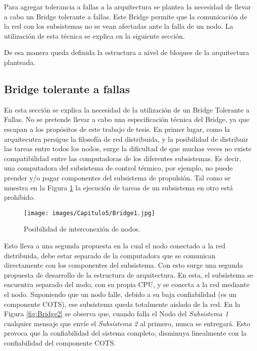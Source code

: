 Para agregar tolerancia a fallas a la arquitectura se plantea la necesidad de 
llevar a cabo un Bridge tolerante a fallas. Este Bridge permite que la comunicación de la red
con los subsistemas no se vean afectadas ante la falla de un nodo. La utilización
de esta técnica se explica en la siguiente sección.

De esa manera queda definida la estructura a nivel de bloques de la arquitectura
planteada. 

\subsection{Bridge tolerante a fallas}\label{subsec:bridge}
En esta sección se explica la necesidad de la utilización de un Bridge 
Tolerante a Fallas. No se pretende llevar a cabo una especificación técnica
del Bridge, ya que escapan a los propósitos de este trabajo de tesis. 
En primer lugar, como la arquitecutra persigue la filosofía de red distribuida, 
y la posibilidad de distribuir las tareas entre todos los nodos, surge la 
dificultad de que muchas veces no existe compatibilidad entre las computadoras 
de los diferentes subsistemas. Es decir, una computadora del subsistema 
de control térmico, por ejemplo, no puede prender y/o pagar componentes del 
subsistema de propulsión. Tal como se muestra en la Figura \ref{fig:Bridge1} la 
ejecución de tareas de un subsistema en otro está prohíbido. 

\begin{figure}[h!]
 \centering
 \texttt{[image: images/Capitulo5/Bridge1.jpg]}
  \caption{Posibilidad de interconexión de nodos.}
\label{fig:Bridge1}
\end{figure} 

Esto lleva a una segunda propuesta en la cual el nodo conectado 
a la red distribuida, debe estar separado de la computadora que 
se comunican directamente con los componentes del subsistema. Con esto
surge una segunda propuesta de desarrollo de la estructura de arquitectura.
En esta, el subsistema se encuentra separado del nodo, con su propia CPU, y se conecta
a la red mediante el nodo. Suponiendo que un nodo falle,
 debido a su baja confiabilidad (es un componente COTS), ese subsistema queda totalmente
aislado de la red. En la Figura \ref{fig:Bridge2} se observa que, cuando falla el Nodo
del \textit{Subsistema 1} cualquier mensaje que envíe el \textit{Subsistema 2} al primero, 
nunca se entregará. Esto provoca que la confiabilidad del sistema completo, disminuya 
linealmente con la confiabilidad del componente COTS. 

